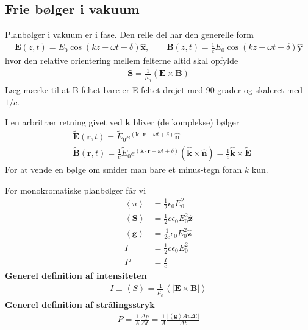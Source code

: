 \documentclass[a4paper]{article}
\begin{document}
    \subsection{Frie bølger i vakuum}
    Planbølger i vakuum er i fase. Den relle del har den generelle form \begin{align*}
       \boxed{\mathbf{E}(z, t) = E_0 \cos (kz - \omega t + \delta ) \hat{\mathbf{x}}, \qquad \mathbf{B}(z, t) = \frac{1}{c} E_0 \cos (kz - \omega t + \delta ) \hat{\mathbf{y}}} \tag{9.49}
    \end{align*}
    hvor den relative orientering mellem felterne altid skal opfylde \begin{align*}
        \mathbf{S} = \frac{1}{\mu _0} (\mathbf{E} \times \mathbf{B})
    \end{align*}
    Læg mærke til at B-feltet bare er E-feltet drejet med 90 grader og skaleret med \(1 / c\).
    
    I en arbritrær retning givet ved \(\mathbf{k}\) bliver (de komplekse) bølger \begin{align*}
        &\boxed{\tilde{\mathbf{E}}(\mathbf{r}, t) =  \tilde{E}_0 e^{(\mathbf{k} \cdot \mathbf{r} - \omega t + \delta )} \hat{\mathbf{n}}}\\
        &\boxed{\tilde{\mathbf{B}}(\mathbf{r}, t) =  \frac{1}{c}\tilde{E}_0 e^{(\mathbf{k} \cdot \mathbf{r} - \omega t + \delta )} \left( \hat{\mathbf{k}} \times \hat{\mathbf{n}} \right) = \frac{1}{c} \hat{\mathbf{k}} \times \tilde{\mathbf{E}}} \tag{9.50}
    \end{align*}
    For at vende en bølge om smider man bare et minus-tegn foran \(k\) kun. 
    
    For monokromatiske planbølger får vi \begin{align*}
        \left\langle u \right\rangle &= \frac{1}{2} \epsilon _0 E_0^2 \tag{9.61}\\
        \left\langle \mathbf{S} \right\rangle &= \frac{1}{2} c \epsilon _0 E_0 ^2 \hat{\mathbf{z}}\tag{9.62}\\
        \left\langle \mathbf{g} \right\rangle &= \frac{1}{2c} \epsilon _0 E_0 ^2 \hat{\mathbf{z}}\tag{9.63}\\
        I &= \frac{1}{2} c \epsilon _0 E_0^2\tag{9.64}\\
        P &= \frac{I}{c}\tag{9.65}
    \end{align*}
    \textbf{Generel definition af intensiteten}\begin{align*}
        \boxed{I \equiv \left\langle S \right\rangle = \frac{1}{\mu _0}\left\langle \left| \mathbf{E} \times \mathbf{B} \right|   \right\rangle }\tag{9.64}
    \end{align*}
    \textbf{Generel definition af strålingsstryk} \begin{align*}
        P = \frac{1}{A} \frac{\Delta p}{\Delta t} = \frac{1}{A} \frac{\left| \left\langle \mathbf{g} \right\rangle A v \Delta t \right| }{\Delta t}
    \end{align*}
\end{document}
